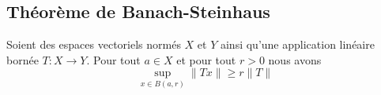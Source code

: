 \subsection{Théorème de Banach-Steinhaus}

\begin{lemma}     \label{LEMooPIPLooMppGSO}
    Soient des espaces vectoriels normés \( X\) et \( Y\) ainsi qu'une application linéaire bornée \( T\colon X\to Y\). Pour tout \( a\in X\) et pour tout \( r>0\) nous avons
    \begin{equation}
        \sup_{x\in B(a,r)}\| Tx \|\geq r\| T \|
    \end{equation}
\end{lemma}

